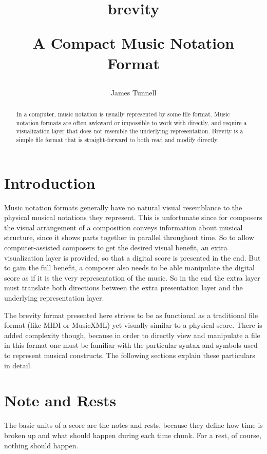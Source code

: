\documentclass{scrartcl}
\begin{document}
\author{James Tunnell}
\title{brevity\\
\begin{LARGE}
A Compact Music Notation Format
\end{LARGE}}
\maketitle

\begin{abstract}
In a computer, music notation is usually represented by some file format. Music notation formats are often awkward or impossible to work with directly, and require a visualization layer that does not resemble the underlying representation. Brevity is a simple file format that is straight-forward to both read and modify directly.
\end{abstract}

\tableofcontents

\section{Introduction}
Music notation formats generally have no natural visual resemblance to the physical musical notations they represent. This is unfortunate since for composers the visual arrangement of a composition conveys information about musical structure, since it shows parts together in parallel throughout time. So to allow computer-assisted composers to get the desired visual benefit, an extra visualization layer is provided, so that a digital score is presented in the end. But to gain the full benefit, a composer also needs to be able manipulate the digital score as if it is the very representation of the music. So in the end the extra layer must translate both directions between the extra presentation layer and the underlying representation layer.

The brevity format presented here strives to be as functional as a traditional file format (like MIDI or MusicXML) yet visually similar to a physical score. There is added complexity though, because in order to directly view and manipulate a file in this format one must be familiar with the particular syntax and symbols used to represent musical constructs. The following sections explain these particulars in detail.

\section{Note and Rests}
The basic units of a score are the notes and rests, because they define how time is broken up and what should happen during each time chunk. For a rest, of course, nothing should happen. 
\end{document}
